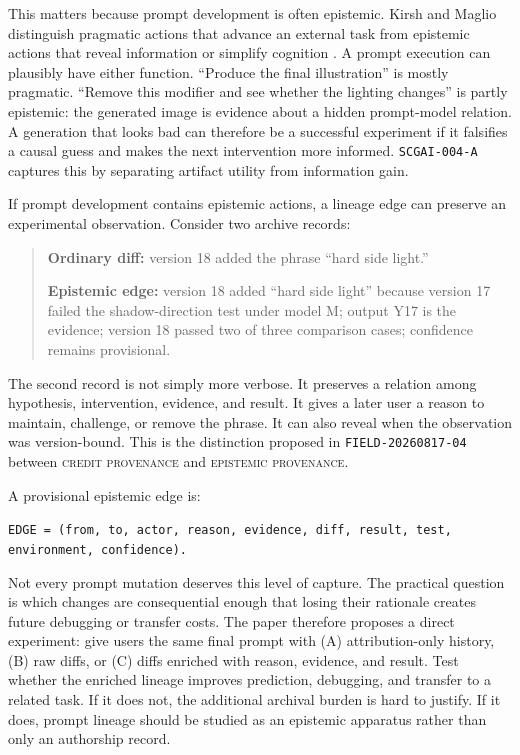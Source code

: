 \documentclass[11pt]{article}
\newcommand{\zettel}[1]{\texttt{#1}}
\newcommand{\term}[1]{\textsc{#1}}
\begin{document}
This matters because prompt development is often epistemic. Kirsh and Maglio distinguish pragmatic actions that advance an external task from epistemic actions that reveal information or simplify cognition \cite{kirsh1994distinguishing}. A prompt execution can plausibly have either function. ``Produce the final illustration'' is mostly pragmatic. ``Remove this modifier and see whether the lighting changes'' is partly epistemic: the generated image is evidence about a hidden prompt-model relation. A generation that looks bad can therefore be a successful experiment if it falsifies a causal guess and makes the next intervention more informed. \zettel{SCGAI-004-A} captures this by separating artifact utility from information gain.

If prompt development contains epistemic actions, a lineage edge can preserve an experimental observation. Consider two archive records:

\begin{quote}
\textbf{Ordinary diff:} version 18 added the phrase ``hard side light.''

\textbf{Epistemic edge:} version 18 added ``hard side light'' because version 17 failed the shadow-direction test under model M; output Y17 is the evidence; version 18 passed two of three comparison cases; confidence remains provisional.
\end{quote}

The second record is not simply more verbose. It preserves a relation among hypothesis, intervention, evidence, and result. It gives a later user a reason to maintain, challenge, or remove the phrase. It can also reveal when the observation was version-bound. This is the distinction proposed in \zettel{FIELD-20260817-04} between \term{credit provenance} and \term{epistemic provenance}.

A provisional epistemic edge is:

\begin{center}
\texttt{EDGE = (from, to, actor, reason, evidence, diff, result, test, environment, confidence).}
\end{center}

Not every prompt mutation deserves this level of capture. The practical question is which changes are consequential enough that losing their rationale creates future debugging or transfer costs. The paper therefore proposes a direct experiment: give users the same final prompt with (A) attribution-only history, (B) raw diffs, or (C) diffs enriched with reason, evidence, and result. Test whether the enriched lineage improves prediction, debugging, and transfer to a related task. If it does not, the additional archival burden is hard to justify. If it does, prompt lineage should be studied as an epistemic apparatus rather than only an authorship record.
\end{document}

